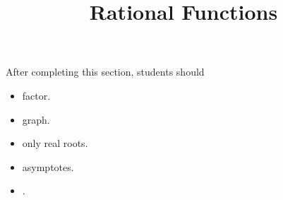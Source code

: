 \documentclass{ximera}
\title{Rational Functions}
\begin{document}
\begin{abstract}
\end{abstract}
\maketitle

\begin{sectionOutcomes}
After completing this section, students should 

\begin{itemize}
\item factor.
\item graph.
\item only real roots.
\item asymptotes.
\item .
\end{itemize}
\end{sectionOutcomes}
\end{document}
